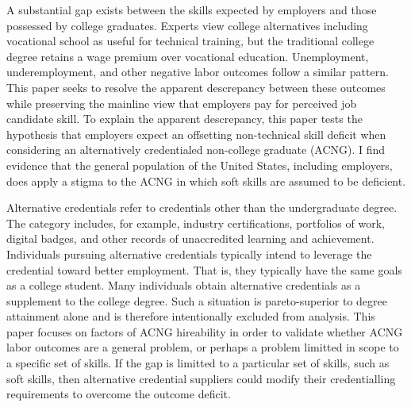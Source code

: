 \documentclass[review]{elsarticle}
\begin{document}
A substantial gap exists between the skills expected by employers and those possessed by college graduates\cite{mcgarry2016examination, malik2017great, abbasi2018analysis, gingras2000there}.
Experts view college alternatives including vocational school as useful for technical training, but the traditional college degree retains a wage premium over vocational education.
Unemployment, underemployment, and other negative labor outcomes follow a similar pattern\cite{smith_2011}.
This paper seeks to resolve the apparent descrepancy between these outcomes while preserving the mainline view that employers pay for perceived job candidate skill.
To explain the apparent descrepancy,
this paper tests the hypothesis that employers expect an offsetting non-technical skill deficit when considering an alternatively credentialed non-college graduate (ACNG).
I find evidence that the general population of the United States, including employers, does apply a stigma to the ACNG in which soft skills are assumed to be deficient.

Alternative credentials refer to credentials other than the undergraduate degree\cite{brown2017complex}.
The category includes, for example,
industry certifications,
portfolios of work,
digital badges, and other records of unaccredited learning and achievement.
Individuals pursuing alternative credentials typically intend to leverage the credential toward better employment.
That is, they typically have the same goals as a college student.
Many individuals obtain alternative credentials as a supplement to the college degree.
Such a situation is pareto-superior to degree attainment alone and is therefore intentionally excluded from analysis.
This paper focuses on factors of ACNG hireability in order to validate whether ACNG labor outcomes are a general problem,
or perhaps a problem limitted in scope to a specific set of skills.
If the gap is limitted to a particular set of skills, such as soft skills, then alternative credential suppliers could modify their credentialling requirements to overcome the outcome deficit.

\end{document}
